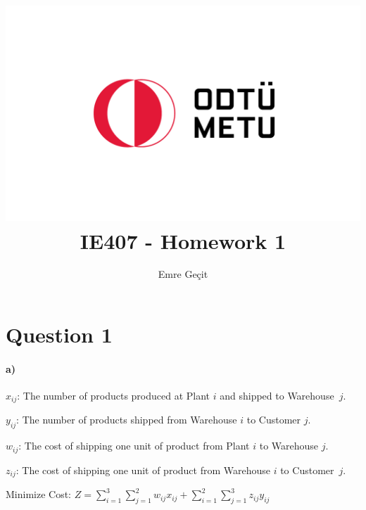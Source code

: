 \documentclass{article}
\author{Emre Geçit}
\title{\includegraphics{9.4.png}\\ IE407 - Homework 1}
\begin{document}
\maketitle

\newpage
\section*{Question 1}
\paragraph*{a)}

$x_{ij}$: The number of products produced at Plant $i$ and shipped to \mbox{Warehouse $j$}.

$y_{ij}$: The number of products shipped from Warehouse $i$ to Customer $j$.

$w_{ij}$: The cost of shipping one unit of product from Plant $i$ to Warehouse $j$.

$z_{ij}$: The cost of shipping one unit of product from Warehouse $i$ to \mbox{Customer $j$}.

Minimize Cost: $Z = \sum_{i=1}^{3} \sum_{j=1}^{2} w_{ij} x_{ij} + \sum_{i=1}^{2} \sum_{j=1}^{3} z_{ij} y_{ij}$
\end{document}
